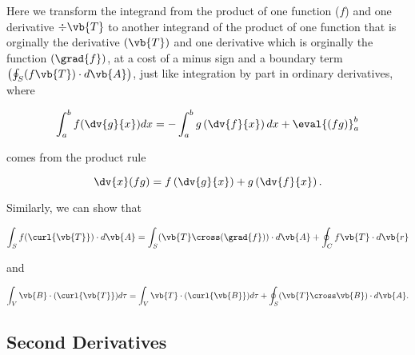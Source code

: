 \documentclass[english,a4paper,12pt]{report}
\begin{document}
Here we transform the integrand from the product of one function (\(f\)) and one derivative \(\div{\vb{T}}\) to another integrand of the product of one function that is orginally the derivative \((\vb{T})\) and one derivative which is orginally the function \((\grad{f})\), at a cost of a minus sign and a boundary term \(\left(\oint_{S} (f\vb{T}) \cdot d\vb{A}\right)\), just like integration by part in ordinary derivatives, where
	
\begin{equation} 
	\int_{a}^{b} f(\dv{g}{x})dx = -\int_{a}^{b} g\left(\dv{f}{x}\right)dx + \eval{\left(fg\right)}_a^b 
\end{equation}
	
comes from the product rule
	
\begin{equation} 
	\dv{x}(fg) = f\left(\dv{g}{x}\right) + g\left(\dv{f}{x}\right). 
\end{equation}

Similarly, we can show that 
	
\begin{equation} 
	\int_{S} f(\curl{\vb{T}}) \cdot d\vb{A} = \int_{S} (\vb{T} \cross (\grad{f})) \cdot d\vb{A} + \oint_{C} f\vb{T} \cdot d\vb{r} 
\end{equation}
	
and

\begin{equation} 
	\int_{V} \vb{B} \cdot (\curl{\vb{T}}) d\tau = \int_{V} \vb{T} \cdot (\curl{\vb{B}}) d\tau + \oint_{S} (\vb{T} \cross \vb{B}) \cdot d\vb{A}. 
\end{equation}
	
\subsection{Second Derivatives}
	
\end{document}

